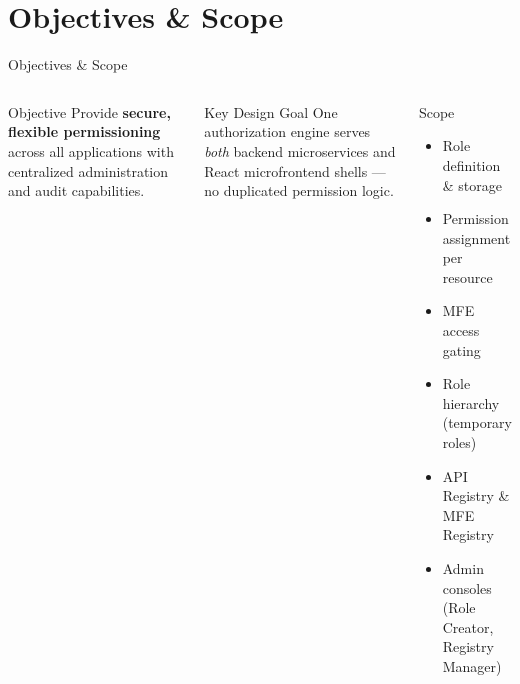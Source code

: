 \documentclass[aspectratio=169]{beamer}
\begin{document}
\section{Objectives \& Scope}
\begin{frame}{Objectives \& Scope}
  \begin{columns}[t]
    \begin{block}{Objective}
      Provide \textbf{secure, flexible permissioning} across all applications with
      centralized administration and audit capabilities.
    \end{block}
    \vspace{0.2cm}
    \begin{alertblock}{Key Design Goal}
      One authorization engine serves \emph{both} backend microservices and
      React microfrontend shells --- no duplicated permission logic.
    \end{alertblock}

    \begin{exampleblock}{Scope}
      \begin{itemize}
        \item Role definition \& storage
        \item Permission assignment per resource
        \item MFE access gating
        \item Role hierarchy (temporary roles)
        \item API Registry \& MFE Registry
        \item Admin consoles (Role Creator, Registry Manager)
      \end{itemize}
    \end{exampleblock}
  \end{columns}
\end{frame}

\end{document}
